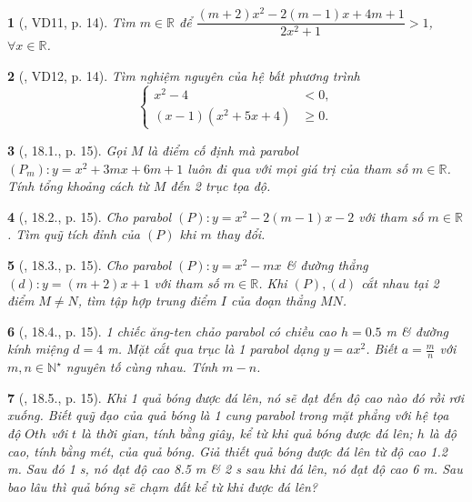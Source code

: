 \documentclass{article}
\newtheorem{baitoan}{}
\begin{document}
\begin{baitoan}[\cite{Hai_Hung_Thu_Tung_ncpt_Toan_10_tap_2}, VD11, p. 14]
	Tìm $m\in\mathbb{R}$ để $\dfrac{(m + 2)x^2 - 2(m - 1)x + 4m + 1}{2x^2 + 1} > 1$, $\forall x\in\mathbb{R}$.
\end{baitoan}

\begin{baitoan}[\cite{Hai_Hung_Thu_Tung_ncpt_Toan_10_tap_2}, VD12, p. 14]
	Tìm nghiệm nguyên của hệ bất phương trình
	\begin{equation*}
		\left\{\begin{split}
			x^2 - 4 &< 0,\\
			(x - 1)(x^2 + 5x + 4)&\ge0.
		\end{split}\right.
	\end{equation*}
\end{baitoan}

\begin{baitoan}[\cite{Hai_Hung_Thu_Tung_ncpt_Toan_10_tap_2}, 18.1., p. 15]
	Gọi $M$ là điểm cố định mà parabol $(P_m):y = x^2 + 3mx + 6m + 1$ luôn đi qua với mọi giá trị của tham số $m\in\mathbb{R}$. Tính tổng khoảng cách từ $M$ đến 2 trục tọa độ.
\end{baitoan}

\begin{baitoan}[\cite{Hai_Hung_Thu_Tung_ncpt_Toan_10_tap_2}, 18.2., p. 15]
	Cho parabol $(P):y = x^2 - 2(m - 1)x - 2$ với tham số $m\in\mathbb{R}$. Tìm quỹ tích đỉnh của $(P)$ khi $m$ thay đổi.
\end{baitoan}

\begin{baitoan}[\cite{Hai_Hung_Thu_Tung_ncpt_Toan_10_tap_2}, 18.3., p. 15]
	Cho parabol $(P):y = x^2 - mx$ \& đường thẳng $(d):y = (m + 2)x + 1$ với tham số $m\in\mathbb{R}$. Khi $(P),(d)$ cắt nhau tại 2 điểm $M\ne N$, tìm tập hợp trung điểm $I$ của đoạn thẳng $MN$.
\end{baitoan}

\begin{baitoan}[\cite{Hai_Hung_Thu_Tung_ncpt_Toan_10_tap_2}, 18.4., p. 15]
	1 chiếc ăng-ten chảo parabol có chiều cao $h = 0.5$ {\rm m} \& đường kính miệng $d = 4$ {\rm m}. Mặt cắt qua trục là 1 parabol dạng $y = ax^2$. Biết $a = \frac{m}{n}$ với $m,n\in\mathbb{N}^\star$ nguyên tố cùng nhau. Tính $m - n$.
\end{baitoan}

\begin{baitoan}[\cite{Hai_Hung_Thu_Tung_ncpt_Toan_10_tap_2}, 18.5., p. 15]
	Khi 1 quả bóng được đá lên, nó sẽ đạt đến độ cao nào đó rồi rơi xuống. Biết quỹ đạo của quả bóng là 1 cung parabol trong mặt phẳng với hệ tọa độ $Oth$ với $t$ là thời gian, tính bằng giây, kể từ khi quả bóng được đá lên; $h$ là độ cao, tính bằng mét, của quả bóng. Giả thiết quả bóng được đá lên từ độ cao {\rm1.2 m}. Sau đó {\rm1 s}, nó đạt độ cao {\rm8.5 m} \& {\rm2 s} sau khi đá lên, nó đạt độ cao {\rm6 m}. Sau bao lâu thì quả bóng sẽ chạm đất kể từ khi được đá lên?
\end{baitoan}
\end{document}
